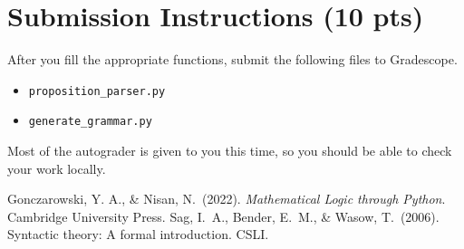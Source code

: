 \documentclass{article}
\begin{document}
    
\section*{Submission Instructions (10 pts)}
    After you fill the appropriate functions, submit the following files to Gradescope.
    \begin{itemize}
        \item \lstinline{proposition_parser.py}
        \item \lstinline{generate_grammar.py}
    \end{itemize}
    Most of the autograder is given to you this time, so you should be able to check your work locally.

\begin{thebibliography}{9}
    Gonczarowski, Y. A., \& Nisan, N.\ (2022). \textit{Mathematical Logic through Python}. Cambridge University Press.
    Sag, I.\ A., Bender, E.\ M., \& Wasow, T.\ (2006). Syntactic theory: A formal introduction. CSLI. 
\end{thebibliography}
\end{document}
